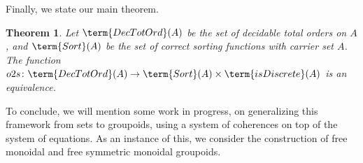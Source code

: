 \documentclass{article}
\newtheorem{definition}{Definition}
\newtheorem{theorem}{Theorem}
\begin{document}

\noindent
Finally, we state our main theorem.
\begin{theorem}
    Let $\term{DecTotOrd}(A)$ be the set of decidable total orders on $A$,
    and $\term{Sort}(A)$ be the set of correct sorting functions with carrier set $A$.
    The function $o2s \colon \term{DecTotOrd}(A) \to \term{Sort}(A) \times \term{isDiscrete}(A)$
    is an equivalence.
\end{theorem}

\medskip\noindent To conclude, we will mention some work in progress, on generalizing this framework from sets to
groupoids, using a system of coherences on top of the system of equations. As an instance of this, we consider the
construction of free monoidal and free symmetric monoidal groupoids.

\printbibliography
\end{document}
